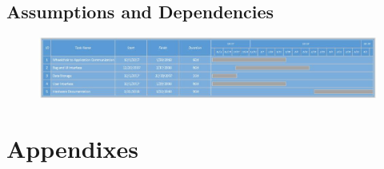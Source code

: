 \documentclass[onecolumn, draftclsnofoot,10pt, compsoc]{IEEEtran}
\begin{document}
\subsection{Assumptions and Dependencies}
\begin{figure}[h!]
	\centering
	\includegraphics[width=\linewidth, scale=0.7]{PrelimGanttChart.jpg}
\end{figure}

\section{Appendixes}
\end{document}
